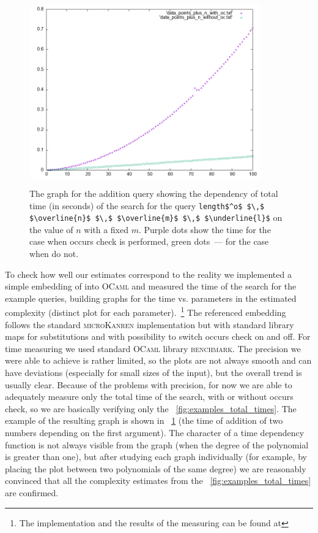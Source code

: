 \begin{figure}[t]
    \includegraphics[width=10cm,height=8cm]{plot_example}
  \caption{The graph for the addition query showing the dependency of total time (in seconds) of the search for the query \lstinline|length$^o$ $\,$ $\overline{n}$ $\,$ $\overline{m}$ $\,$ $\underline{l}$| on the value of $n$ with a fixed $m$. Purple dots show the time for the case when occurs check is performed, green dots~--- for the case when do not. }
  \label{fig:plot_example}
\end{figure}

To check how well our estimates correspond to the reality we implemented a simple embedding of \mK into \textsc{OCaml} and measured the time of the search for the example queries,
building graphs for the time vs. parameters in the estimated complexity (distinct plot for each parameter).~\footnote{The implementation and the results of the measuring can be found at } The referenced embedding follows the standard \textsc{microKanren} implementation but with standard library maps for substitutions and with possibility to switch occurs check on and off.
For time measuring we used standard \textsc{OCaml} library \textsc{benchmark}. The precision we were able to achieve is rather limited, so the plots are not always smooth and can have
deviations (especially for small sizes of the input), but the overall trend is usually clear. Because of the problems with precision, for now we are able to adequately measure only the total
time of the search, with or without occurs check, so we are basically verifying only the \figureword~\ref{fig:examples_total_times}. 
The example of the resulting graph is shown in \figureword~\ref{fig:plot_example} (the time of addition of two numbers depending on the first argument). The character of a time dependency function
is not always visible from the graph (when the degree of the polynomial is greater than one), but after studying each graph individually (for example, by placing the plot between two polynomials of the same degree) we are reasonably convinced that all the complexity estimates from the \figureword~\ref{fig:examples_total_times} are confirmed.
